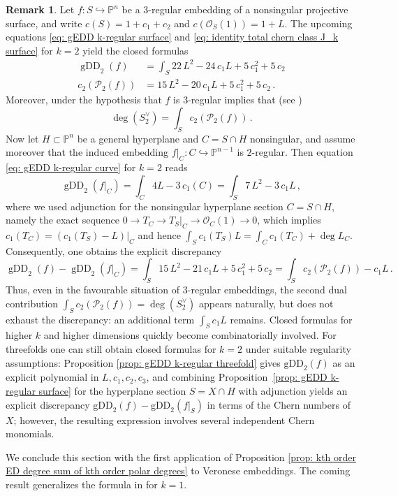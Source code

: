 \documentclass[11pt,reqno]{amsart}
\numberwithin{equation}{section}
\theoremstyle{plain}
\numberwithin{theorem}{section}
\theoremstyle{definition}
\newtheorem{remark}[theorem]{Remark}
\renewcommand{\P}{\mathbb{P}}
\newcommand{\PP}{\mathcal{P}}
\newcommand{\gDD}{\operatorname{gDD}}
\begin{document}
\begin{remark}
Let $f\colon S\hookrightarrow\P^n$ be a $3$-regular embedding of a nonsingular projective surface, and write $c(S)=1+c_1+c_2$ and $c(\mathcal O_S(1))=1+L$. The upcoming equations \eqref{eq: gEDD k-regular surface} and \eqref{eq: identity total chern class J_k surface} for $k=2$ yield the closed formulas
\begin{align*}
    \gDD_2(f) &= \int_S 22\,L^2-24\,c_1L+5\,c_1^2+5\,c_2\\
    c_2(\PP_2(f)) &= 15\,L^2-20\,c_1L+5\,c_1^2+5\,c_2\,.
\end{align*}
Moreover, under the hypothesis that $f$ is $3$-regular implies that (see \cite[Proposition 2.4]{lanteri1999higher})
\[
\deg(S_2^\vee)=\int_S c_2(\PP_2(f))\,.
\]
Now let $H\subset\mathbb P^n$ be a general hyperplane and $C=S\cap H$ nonsingular, and assume moreover that the induced embedding $f|_C\colon C\hookrightarrow \mathbb P^{n-1}$ is $2$-regular. Then equation \eqref{eq: gEDD k-regular curve} for $k=2$ reads
\[
\gDD_2(f|_C) = \int_C 4L-3\,c_1(C) = \int_S 7\,L^2-3\,c_1L\,,
\]
where we used adjunction for the nonsingular hyperplane section $C=S\cap H$, namely the exact sequence
$0\to T_C\to T_S|_C\to\mathcal O_C(1)\to 0$, which implies
$c_1(T_C)=(c_1(T_S)-L)|_C$ and hence
$\int_S c_1(T_S)L=\int_C c_1(T_C)+\deg L_C$. Consequently, one obtains the explicit discrepancy
\[
\gDD_2(f)-\gDD_2(f|_C)
=\int_S 15\,L^2-21\,c_1L+5\,c_1^2+5\,c_2
=\int_S c_2(\PP_2(f))-c_1L\,.
\]
Thus, even in the favourable situation of $3$-regular  embeddings, the second dual contribution
$\int_S c_2(\PP_2(f))=\deg(S_2^\vee)$ appears naturally, but does not exhaust the discrepancy: an additional term
$\int_S c_1L$ remains. Closed formulas for higher $k$ and higher dimensions quickly become combinatorially involved. 
For threefolds one can still obtain closed formulas for $k=2$ under suitable regularity assumptions:
Proposition \ref{prop: gEDD k-regular threefold} gives $\mathrm{gDD}_2(f)$ as an explicit polynomial in $L,c_1,c_2,c_3$, and combining
Proposition~\ref{prop: gEDD k-regular surface} for the hyperplane section $S=X\cap H$ with adjunction yields an explicit discrepancy
$\mathrm{gDD}_2(f)-\mathrm{gDD}_2(f|_S)$ in terms of the Chern numbers of $X$; however, the resulting expression involves several independent Chern monomials.
\end{remark}

We conclude this section with the first application of Proposition \ref{prop: kth order ED degree sum of kth order polar degrees} to Veronese embeddings. The coming result generalizes the formula in \cite[Proposition 7.10]{DHOST} for $k=1$.
\end{document}
